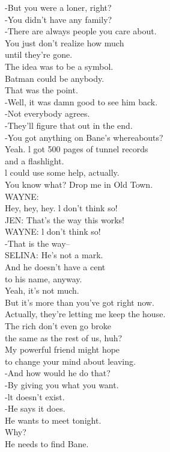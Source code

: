 \documentclass{article}
\begin{document}
\begin{multicols}{3}
-But you were a loner, right?\\
-You didn't have any family?\\
-There are always people you care about.\\
You just don't realize how much\\
until they're gone.\\
The idea was to be a symbol.\\
Batman could be anybody.\\
That was the point.\\
-Well, it was damn good to see him back.\\
-Not everybody agrees.\\
-They'll figure that out in the end.\\
-You got anything on Bane's whereabouts?\\
Yeah. l got 500 pages of tunnel records\\
and a flashlight.\\
l could use some help, actually.\\
You know what? Drop me in Old Town.\\
WAYNE:\\
Hey, hey, hey. l don't think so!\\
JEN: That's the way this works!\\
WAYNE: l don't think so!\\
-That is the way--\\
SELINA: He's not a mark.\\
And he doesn't have a cent\\
to his name, anyway.\\
Yeah, it's not much.\\
But it's more than you've got right now.\\
Actually, they're letting me keep the house.\\
The rich don't even go broke\\
the same as the rest of us, huh?\\
My powerful friend might hope\\
to change your mind about leaving.\\
-And how would he do that?\\
-By giving you what you want.\\
-lt doesn't exist.\\
-He says it does.\\
He wants to meet tonight.\\
Why?\\
He needs to find Bane.\\

\end{multicols}
\end{document}
